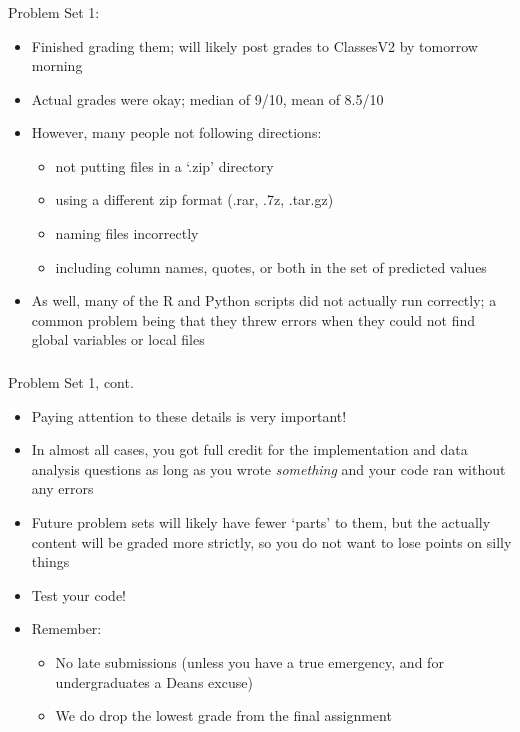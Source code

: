 \documentclass[xetex,mathserif,serif,aspectratio=169]{beamer}
\begin{document}
\begin{frame}[fragile] \frametitle{} \oldB \small

Problem Set 1:
\begin{itemize}
\item Finished grading them; will likely post grades to ClassesV2 by tomorrow morning \pause
\item Actual grades were okay; median of 9/10, mean of 8.5/10 \pause
\item However, many people not following directions:
\begin{itemize}
\item not putting files in a `.zip' directory
\item using a different zip format (.rar, .7z, .tar.gz)
\item naming files incorrectly
\item including column names, quotes, or both in the set of predicted values \pause
\end{itemize}
\item As well, many of the R and Python scripts did not actually run correctly;
a common problem being that they threw errors when they could not find global variables
or local files
\end{itemize}

\end{frame}

\begin{frame}[fragile] \frametitle{} \oldB \small

Problem Set 1, cont.
\begin{itemize}
\item Paying attention to these details is very important!
\item In almost all cases, you got full credit for the implementation and
data analysis questions as long as you wrote \textit{something} and your code
ran without any errors
\item Future problem sets will likely have fewer `parts' to them,
but the actually content will be graded more strictly, so you do not
want to lose points on silly things
\item Test your code!
\item Remember:
\begin{itemize}
\item No late submissions (unless you have a true emergency, and for undergraduates
a Deans excuse)
\item We do drop the lowest grade from the final assignment
\end{itemize}
\end{itemize}

\end{frame}
\end{document}
